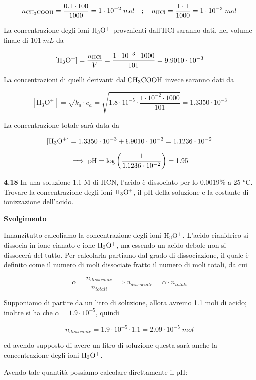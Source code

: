 $$n_{\rm CH_3COOH}=\frac{0.1 \cdot 100}{1000}=1 \cdot 10^{-2}\;mol
\quad;\quad
n_{\rm HCl}=\frac{1 \cdot 1}{1000}=1 \cdot 10^{-3}\;mol$$

La concentrazione degli ioni $\rm H_3O^+$ provenienti dall'HCl saranno dati, nel volume finale di $101\;mL$ da

$$[\text{H}_3\text{O}^+]=\frac{n_{\rm HCl}}{V}
=\frac{1 \cdot 10^{-3} \cdot 1000}{101}
=9.9010\cdot 10^{-3}$$

La concentrazioni di quelli derivanti dal $\rm CH_3COOH$ invece saranno dati da

$$[\text{H}_3\text{O}^+]=\sqrt{k_a \cdot c_a}
=\sqrt{1.8 \cdot 10^{-5}\cdot \frac{1 \cdot 10^{-2} \cdot 1000}{101}}
=1.3350 \cdot 10^{-3}$$

La concentrazione totale sarà data da

$$[\rm H_3O^+]=1.3350 \cdot 10^{-3} + 9.9010\cdot 10^{-3}=1.1236 \cdot 10^{-2}$$

$$\implies
\rm pH=\log{\left(\frac{1}{1.1236 \cdot 10^{-2}}\right)}
=1.95$$

\vspace{0.2cm}\textbf{4.18}  In una soluzione 1.1 M di HCN, l'acido è dissociato per lo 0.0019\% a 25 °C. Trovare la concentrazione degli ioni $\rm H_3O^+$, il pH della soluzione e la costante di ionizzazione dell'acido. 

\vspace{0.2cm}\large\textbf{Svolgimento}\normalsize

\vspace{0.2cm}Innanzitutto calcoliamo la concentrazione degli ioni $\rm H_3O^+$. L'acido cianidrico si dissocia in ione cianato e ione $\rm H_3O^+$, ma essendo un acido debole non si dissocerà del tutto. Per calcolarla partiamo dal grado di dissociazione, il quale è definito come il numero di moli dissociate fratto il numero di moli totali, da cui

$$\alpha=\frac{n_{dissociate}}{n_{totali}}
\implies
n_{dissociate}=\alpha \cdot n_{totali}$$

Supponiamo di partire da un litro di soluzione, allora avremo 1.1 moli di acido; inoltre si ha che $\alpha=1.9 \cdot 10^{-5}$, quindi

$$n_{dissociate}=1.9 \cdot 10^{-5} \cdot 1.1
=2.09 \cdot 10^{-5}\;mol$$

ed avendo supposto di avere un litro di soluzione questa sarà anche la concentrazione degli ioni $\rm H_3O^+$.

Avendo tale quantità possiamo calcolare direttamente il pH:

